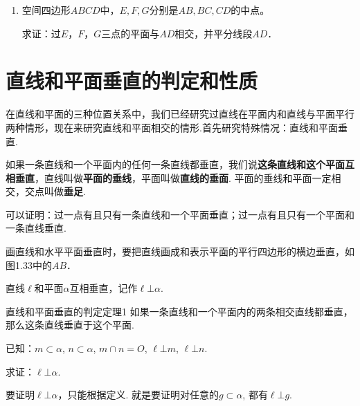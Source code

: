 \begin{enumerate}
\begin{minipage}{.45\textwidth}
\end{minipage}

\item 空间四边形$ABCD$中，$E,F,G$分别是$AB,BC,CD$的中点。

求证：过$E$，$F$，$G$三点的平面与$AD$相交，并平分线段$AD$．
\end{enumerate}

\section{直线和平面垂直的判定和性质}
在直线和平面的三种位置关系中，我们已经研究过直线在平面内和直线与平面平行两种情形，现在来研究直线和平面相交的情形.首先研究特殊情况：直线和平面垂直.

如果一条直线和一个平面内的任何一条直线都垂直，我们说\textbf{这条直线和这个平面互相垂直}，直线叫做\textbf{平面的垂线}，平面叫做\textbf{直线的垂面}. 平面的垂线和平面一定相交，交点叫做\textbf{垂足}.

可以证明：过一点有且只有一条直线和一个平面垂直；过一点有且只有一个平面和一条直线垂直.

画直线和水平平面垂直时，要把直线画成和表示平面的平行四边形的横边垂直，如图1.33中的$AB$．

直线$\ell$和平面$\alpha$互相垂直，记作$\ell\bot \alpha$.

\begin{thm}
 {直线和平面垂直的判定定理1} 如果一条直线和一个平面内的两条相交直线都垂直，那么这条直线垂直于这个平面.   
\end{thm}

已知：$m\subset\alpha$, $n\subset \alpha$, $m\cap n=O$, $\ell\bot m$, $\ell\bot n$.

求证：$\ell\bot \alpha$.


\begin{analyze}
    要证明$\ell\bot \alpha$，只能根据定义. 就是要证明对任意的$g\subset \alpha$, 都有$\ell\bot g$.
\end{analyze}

